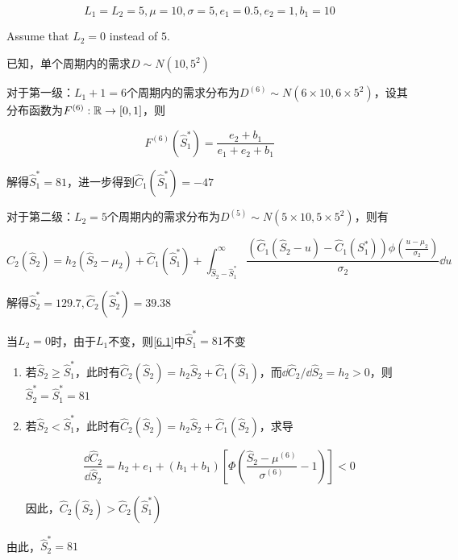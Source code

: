 \documentclass{../notes}
\begin{document}
    \begin{equation*}
        L_1 = L_2 = 5, \mu = 10, \sigma = 5, e_1 = 0.5, e_2 = 1, b_1 = 10
    \end{equation*}

    Assume that $L_2 = 0$ instead of $5$.

    \begin{subquestions}
        \item \label{6.1} 已知，单个周期内的需求$D\sim N(10, 5^2)$

        对于第一级：$L_1 + 1 = 6$个周期内的需求分布为$D^{(6)} \sim N(6\times 10, 6\times 5^2)$，设其分布函数为$F^{(6)}: \mathbb R\rightarrow [0, 1]$，则

        \begin{equation}
            F^{(6)} \left(\hat S_1^*\right) = \frac{e_2 + b_1}{e_1 + e_2 + b_1}
        \end{equation}

        解得$\hat S_1^* = 81$，进一步得到$\hat C_1\left(\hat S_1^*\right) = -47$

        对于第二级：$L_2 = 5$个周期内的需求分布为$D^{(5)}\sim N(5\times 10, 5\times 5^2)$，则有

        \begin{equation}
            \hat C_2\left(\hat S_2\right) = h_2\left(\hat S_2 - \mu_2\right) + \hat C_1\left(\hat S_1^*\right)+\int_{\hat S_2 - \hat S_1^*}^{\infty} \frac{\left(\hat C_1\left(\hat S_2 - u\right) - \hat C_1\left(S_1^*\right)\right)\phi\left(\frac{u-\mu_2}{\sigma_2}\right)}{\sigma_2} \dd u
        \end{equation}

        解得$\hat S_2^* = 129.7, \hat C_2\left(\hat S_2^*\right)=39.38$

        \item 当$L_2 = 0$时，由于$L_1$不变，则\ref{6.1}中$\hat S_1^* = 81$不变

        \begin{enumerate}[label=\arabic{*}.]
            \item 若$\hat S_2\geq \hat S_1^*$，此时有$\hat C_2\left(\hat S_2\right) = h_2\hat S_2 + \hat C_1\left(\hat S_1\right)$，而$\dd \hat C_2 / \dd \hat S_2 = h_2 > 0$，则$\hat S_2^* = \hat S_1^* = 81$
            \item 若$\hat S_2 < \hat S_1^*$，此时有$\hat C_2\left(\hat S_2\right) = h_2\hat S_2 + \hat C_1\left(\hat S_2\right)$，求导

            \begin{equation}
                \frac{\dd \hat C_2}{\dd \hat S_2} = h_2 + e_1 + \left(h_1 + b_1\right)\left[\Phi\left(\frac{\hat S_2 - \mu^{(6)}}{\sigma^{(6)}} - 1\right)\right] < 0
            \end{equation}

            因此，$\hat C_2\left(\hat S_2\right) > \hat C_2 \left(\hat S_1^*\right)$
        \end{enumerate}

        由此，$\hat S_2^* = 81$
    \end{subquestions}
\end{document}
